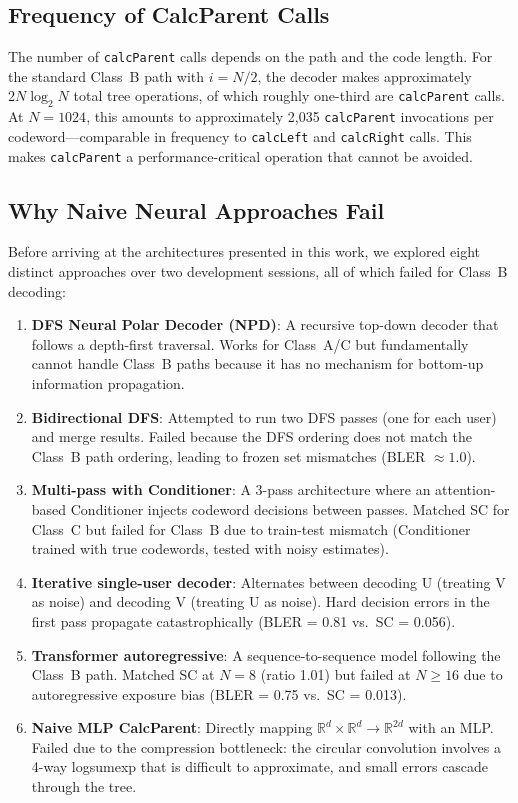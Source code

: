 \documentclass[11pt,a4paper]{article}
\newcommand{\R}{\mathbb{R}}
\begin{document}
\subsection{Frequency of CalcParent Calls}

The number of \texttt{calcParent} calls depends on the path and the code length. For the standard Class~B path with $i = N/2$, the decoder makes approximately $2N \log_2 N$ total tree operations, of which roughly one-third are \texttt{calcParent} calls. At $N = 1024$, this amounts to approximately 2,035 \texttt{calcParent} invocations per codeword---comparable in frequency to \texttt{calcLeft} and \texttt{calcRight} calls. This makes \texttt{calcParent} a performance-critical operation that cannot be avoided.

\subsection{Why Naive Neural Approaches Fail}

Before arriving at the architectures presented in this work, we explored eight distinct approaches over two development sessions, all of which failed for Class~B decoding:

\begin{enumerate}
    \item \textbf{DFS Neural Polar Decoder (NPD)}: A recursive top-down decoder that follows a depth-first traversal. Works for Class~A/C but fundamentally cannot handle Class~B paths because it has no mechanism for bottom-up information propagation.

    \item \textbf{Bidirectional DFS}: Attempted to run two DFS passes (one for each user) and merge results. Failed because the DFS ordering does not match the Class~B path ordering, leading to frozen set mismatches (BLER $\approx 1.0$).

    \item \textbf{Multi-pass with Conditioner}: A 3-pass architecture where an attention-based Conditioner injects codeword decisions between passes. Matched SC for Class~C but failed for Class~B due to train-test mismatch (Conditioner trained with true codewords, tested with noisy estimates).

    \item \textbf{Iterative single-user decoder}: Alternates between decoding U (treating V as noise) and decoding V (treating U as noise). Hard decision errors in the first pass propagate catastrophically (BLER = 0.81 vs.\ SC = 0.056).

    \item \textbf{Transformer autoregressive}: A sequence-to-sequence model following the Class~B path. Matched SC at $N = 8$ (ratio 1.01) but failed at $N \geq 16$ due to autoregressive exposure bias (BLER = 0.75 vs.\ SC = 0.013).

    \item \textbf{Naive MLP CalcParent}: Directly mapping $\R^d \times \R^d \to \R^{2d}$ with an MLP. Failed due to the compression bottleneck: the circular convolution involves a 4-way logsumexp that is difficult to approximate, and small errors cascade through the tree.
\end{enumerate}
\end{document}
